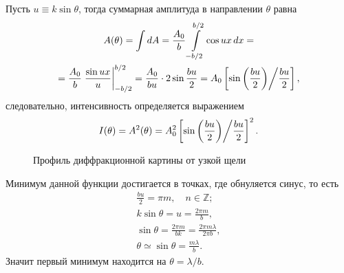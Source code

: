 Пусть $u \equiv k \sin \theta$, тогда суммарная амплитуда в направлении $\theta$ равна
\begin{multline*}
    A(\theta)
    = \int dA
    = \frac{A_0}{b} \int\limits_{-b/2}^{b/2} \cos ux \,d x =\\
    = \frac{A_0}{b} \left. \frac{\sin ux}{u} \right|_{-b/2}^{b/2}
    = \frac{A_0}{bu} \cdot 2 \sin \frac{bu}{2} = A_0 \left[ \sin \left( \frac{bu}{2}\right) \middle/  \frac{bu}{2} \right],
\end{multline*}
следовательно, интенсивность определяется выражением
\begin{equation}
    I(\theta) = A^2(\theta) = A_0^2 \left[ \sin \left( \frac{bu}{2}\right) \middle/  \frac{bu}{2} \right]^2.
\end{equation}


\begin{wrapfigure}[5]{r}{0.47\tw}
    \centering
    \vspace{-0.8pc}
    \caption{Профиль диффракционной картины от узкой щели}
    \label{pic:diffration-on-gap}
\end{wrapfigure}
Минимум данной функции достигается в точках, где обнуляется синус, то есть
\begin{gather*}
    \frac{bu}{2} = \pi m, \quad n \in \mathbb Z;\\
    k \sin \theta = u = \frac{2 \pi m}{b},\\
    \sin \theta = \frac{2 \pi m}{bk} = \frac{2 \pi m \lambda}{2 \pi b},\\
    \theta \simeq \sin \theta = \frac{m \lambda}{b}.
\end{gather*}
Значит первый минимум находится на $\theta = \lambda/b$.

